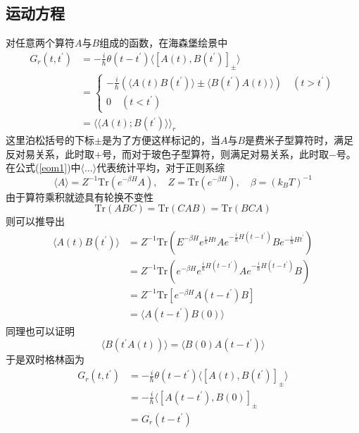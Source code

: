 \subsection{运动方程}
\qquad 对任意两个算符$A$与$B$组成的函数，在海森堡绘景中
\begin{equation}
\begin{aligned}
G_r(t,t^{'})&=-\frac{i}{\hbar}\theta(t-t^{'})\langle\left[A(t),B(t^{'})\right]_\pm\rangle\\
&=\left\{
\begin{array}{cc}
-\frac{i}{\hbar}(\langle A(t)B(t^{'})\rangle\pm\langle B(t^{'})A(t)\rangle)\quad (t>t^{'})\\
0\quad(t<t^{'})
\end{array}
\right.\\
&=\langle\langle A(t);B(t^{'})\rangle\rangle_r\label{eom1}
\end{aligned}
\end{equation}
这里泊松括号的下标$\pm$是为了方便这样标记的，当$A$与$B$是费米子型算符时，满足反对易关系，此时取$+$号，而对于玻色子型算符，则满足对易关系，此时取$-$号。在公式(\ref{eom1})中$\langle\dots\rangle$代表统计平均，对于正则系综
\begin{equation}
\langle A\rangle=Z^{-1}\mathrm{Tr}(e^{-\beta H}A),\quad Z=\mathrm{Tr}(e^{-\beta H}),\quad\beta=(k_BT)^{-1}
\end{equation}
由于算符乘积就迹具有轮换不变性
\begin{equation}
\mathrm{Tr}(ABC)=\mathrm{Tr}(CAB)=\mathrm{Tr}(BCA)
\end{equation}
则可以推导出
\begin{equation}
\begin{aligned}
\langle A(t)B(t^{'})\rangle&=Z^{-1}\mathrm{Tr}(E^{-\beta H}e^{\frac{i}{\hbar}Ht}Ae^{-\frac{i}{\hbar}H(t-t^{'})}Be^{-\frac{i}{\hbar}Ht^{'}})\\
&=Z^{-1}\mathrm{Tr}(e^{-\beta H}e^{\frac{i}{\hbar}H(t-t^{'})}Ae^{-\frac{i}{\hbar}H(t-t^{'})}B)\\
&=Z^{-1}\mathrm{Tr}\left[e^{-\beta H}A(t-t^{'})B\right]\\
&=\langle A(t-t^{'})B(0)\rangle
\end{aligned}
\end{equation}
同理也可以证明
\begin{equation}
\langle B(t^{'}A(t))\rangle=\langle B(0)A(t-t^{'})\rangle
\end{equation}
于是双时格林函为
\begin{equation}
\begin{aligned}
G_r(t,t^{'})&=-\frac{i}{\hbar}\theta(t-t^{'})\langle\left[A(t),B(t^{'})\right]_\pm\rangle\\
&=-\frac{i}{\hbar}\langle\left[A(t-t^{'}),B(0)\right]_\pm\\
&=G_r(t-t^{'})
\end{aligned}
\end{equation}
